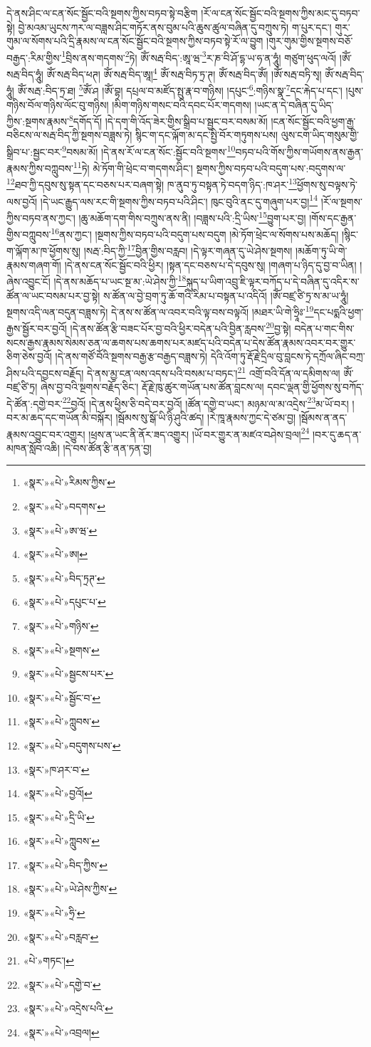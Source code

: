 དེ་ནས་ཤིང་ལ་ངན་སོང་སྦྱོང་བའི་སྔགས་ཀྱིས་བཏབ་སྟེ་བརྩིག །རོ་ལ་ངན་སོང་སྦྱོང་བའི་སྔགས་ཀྱིས་མང་དུ་བཏབ་སྟེ། བྱེ་མའམ་ཡུངས་ཀར་ལ་བཟླས་ཤིང་གཏོར་ནས་བུམ་པའི་ཆུས་ཚུལ་བཞིན་དུ་བཀྲུས་ཏེ། ག་པུར་དང་། གུར་གུམ་ལ་སོགས་པའི་དྲི་རྣམས་ལ་ངན་སོང་སྦྱོང་བའི་སྔགས་ཀྱིས་བཏབ་སྟེ་རོ་ལ་བྱུག །གུར་གུམ་གྱིས་སྔགས་བཅོ་བརྒྱད་:རིམ་གྱིས་\footnote{«སྣར་»«པེ་»རིམས་ཀྱིས་}བྲིས་ནས་གདགས་\footnote{«སྣར་»«པེ་»བདགས་}ཏེ། ཨོཾ་སརྦ་བིད་:ཨཱ་ཝ་\footnote{«སྣར་»«པེ་»ཨ་ཝ་}ར་ཎ་བི་ཤོ་དྷ་ཡ་ཧ་ན་ཧཱུཾ། གཙུག་ཕུད་ལའོ། །ཨོཾ་སརྦ་བིད་ཧཱུཾ། ཨོཾ་སརྦ་བིད་ཕཊ། ཨོཾ་སརྦ་བིད་ཨཱ།\footnote{«སྣར་»«པེ་»ཨ།} ཨོཾ་སརྦ་བིཏ་ཏྲ་ཊ། ཨོཾ་སརྦ་བིད་ཨོཾ། །ཨོཾ་སརྦ་བཏི་སྭ། ཨོཾ་སརྦ་བིད་ཧཱུཾ། ཨོཾ་སརྦ་:བིད་ཏྲ་ཐ། \footnote{«སྣར་»«པེ་»བིད་ཏྲཊ་}ཨོཾ་ཤ །ཨོཾ་བྷ། དཔྲལ་བ་མཛོད་སྤུ་རྣ་བ་གཉིས། །དཔུང་\footnote{«སྣར་»«པེ་»དཔུང་པ་}:གཉིས་སྣ་\footnote{«སྣར་»«པེ་»གཉིས་}དང་རྐེད་པ་དང་། །པུས་གཉིས་བོལ་གཉིས་ལོང་བུ་གཉིས། །མིག་གཉིས་གསང་བའི་དབང་པོར་གདགས། །ཡང་ན་དེ་བཞིན་དུ་ཡིད་ཀྱིས་:སྔགས་རྣམས་\footnote{«སྣར་»«པེ་»སྔགས་}དགོད་དོ། །དེ་དག་གི་འོད་ཟེར་གྱིས་སྒྲིབ་པ་སྦྱང་བར་བསམ་མོ། །ངན་སོང་སྦྱོང་བའི་ཕྱག་རྒྱ་བཅིངས་ལ་སརྦ་བིད་ཀྱི་སྔགས་བཟླས་ཏེ། སྙིང་ག་དང་ལྐོག་མ་དང་སྤྱི་བོར་གཏུགས་པས། ལུས་ངག་ཡིད་གསུམ་གྱི་སྒྲིབ་པ་:སྦྱང་བར་\footnote{«སྣར་»«པེ་»སྦྱངས་པར་}བསམ་མོ། །དེ་ནས་རོ་ལ་ངན་སོང་:སྦྱོང་བའི་སྔགས་\footnote{«སྣར་»«པེ་»སྦྱོང་བ་}བཏབ་པའི་གོས་ཀྱིས་གཡོགས་ནས་རྒྱན་རྣམས་ཀྱིས་བཀླུབས་\footnote{«སྣར་»«པེ་»ཀླུབས་}ཏེ། མེ་ཏོག་གི་ཕྲེང་བ་གདགས་ཤིང་། སྔགས་ཀྱིས་བཏབ་པའི་བདུག་པས་:བདུགས་ལ་\footnote{«སྣར་»«པེ་»བདུགས་པས་}ཐབ་ཀྱི་དབུས་སུ་སྟན་དང་བཅས་པར་བཞག་སྟེ། ཁ་ནུབ་ཏུ་བསྟན་ཏེ་བདག་ཉིད་:ཁ་ཤར་\footnote{«སྣར་»ཁ་ཤར་བ་}ཕྱོགས་སུ་བལྟས་ཏེ་ལས་བྱའོ། །དེ་ཡང་རྒྱུད་ལས་རང་གི་སྔགས་ཀྱིས་བཏབ་པའི་ཤིང་། ཁུང་བུའི་ནང་དུ་གཞུག་པར་བྱ།\footnote{«སྣར་»«པེ་»བྱའོ།} །རོ་ལ་སྔགས་ཀྱིས་བཏབ་ནས་ཀྱང་། །ཆུ་མཆོག་དག་གིས་བཀྲུས་ནས་ནི། །བཟླས་པའི་:དྲི་ཡིས་\footnote{«སྣར་»«པེ་»དྲི་ཡི་}བྱུག་པར་བྱ། །གོས་དང་རྒྱན་གྱིས་བཀླུབས་\footnote{«སྣར་»«པེ་»ཀླུབས་}ནས་ཀྱང་། །སྔགས་ཀྱིས་བཏབ་པའི་བདུག་པས་བདུག །མེ་ཏོག་ཕྲེང་ལ་སོགས་པས་མཆོད། །སྙིང་ག་ལྐོག་མ་ཁ་ཕྱོགས་སུ། །སརྦ་:བིད་ཀྱི་\footnote{«སྣར་»«པེ་»བིད་ཀྱིས་}བྱིན་གྱིས་བརླབ། །དེ་ལྟར་གཞན་དུ་ཡེ་ཤེས་སྔགས། །མཆོག་ཏུ་ཡི་གེ་རྣམས་གཞག་གོ། །དེ་ནས་ངན་སོང་སྦྱོང་བའི་ཕྱིར། །སྟན་དང་བཅས་པ་དེ་དབུས་སུ། །གཞག་པ་ཉིད་དུ་བྱ་བ་ཡིན། །ཞེས་འབྱུང་ངོ། །དེ་ནས་མཆོད་པ་ཡང་སྔ་མ་:ཡེ་ཤེས་ཀྱི་\footnote{«སྣར་»«པེ་»ཡེ་ཤེས་ཀྱིས་}སྐུད་པ་ཡིག་འབྲུ་ཇི་ལྟར་བཀོད་པ་དེ་བཞིན་དུ་འདིར་ས་ཚོན་ལ་ཡང་བསམ་པར་བྱ་སྟེ། ས་ཚོན་ལ་བྱེ་བྲག་ཏུ་ཆོ་གའི་རིམ་པ་བསྟན་པ་འདིའོ། །ཨོཾ་བཛྲ་ཙི་ཏྲ་ས་མ་ཡ་ཧཱུཾ། སྔགས་འདི་ལན་བདུན་བཟླས་ཏེ། དེ་ནས་ས་ཚོན་ལ་འབར་བའི་ལྟ་བས་བལྟའོ། །མཐར་ཡི་གེ་ཧྲཱིཿ་\footnote{«སྣར་»«པེ་»ཧྲི་}དང་པདྨའི་ཕྱག་རྒྱས་སྦྱོར་བར་བྱའོ། །དེ་ནས་ཚོན་རྩི་བཟང་པོར་བྱ་བའི་ཕྱིར་བདེན་པའི་བྱིན་རླབས་\footnote{«སྣར་»«པེ་»བརླབ་}བྱ་སྟེ། བདེན་པ་གང་གིས་སངས་རྒྱས་རྣམས་སེམས་ཅན་ལ་ཆགས་པས་ཆགས་པར་མཛད་པའི་བདེན་པ་དེས་ཚོན་རྣམས་འབར་བར་གྱུར་ཅིག་ཅེས་བྱའོ། །དེ་ནས་གཙོ་བོའི་སྔགས་བརྒྱ་རྩ་བརྒྱད་བཟླས་ཏེ། དེའི་འོག་ཏུ་རྡོ་རྗེ་དྲིལ་བུ་བླངས་ཏེ་དཀྲོལ་ཞིང་བཀྲ་ཤིས་པའི་དབྱངས་བརྗོད། དེ་ནས་མྱ་ངན་ལས་འདས་པའི་བསམ་པ་བཏང་།\footnote{«པེ་»གཏང་།} འགྲོ་བའི་དོན་ལ་དམིགས་ལ། ཨོཾ་བཛྲ་ཙི་ཏྲ། ཞེས་བྱ་བའི་སྔགས་བརྗོད་ཅིང་། རྡོ་རྗེ་ཁུ་ཚུར་གཡོན་པས་ཚོན་བླངས་ལ། དབང་ལྡན་གྱི་ཕྱོགས་སུ་བཀོད་དེ་ཚོན་:དགྱེ་བར་\footnote{«སྣར་»«པེ་»དགྱེ་བ་}བྱའོ། །དེ་ནས་ཕྱིས་ཅི་བདེ་བར་བྱའོ། །ཚོན་དགྱེ་བ་ཡང་། མཉམ་ལ་མ་འདྲེས་\footnote{«སྣར་»«པེ་»འདྲེས་པའི་}མ་ཡོ་བར། །བར་མ་ཆད་དང་གཡོན་མི་བསྐོར། །སྦོམས་སུ་སྒོ་ཡི་ཉི་ཤུའི་ཚད། །རེ་ཁཱ་རྣམས་ཀྱང་དེ་ཙམ་བྱ། །སྦོམས་ན་ནད་རྣམས་འབྱུང་བར་འགྱུར། །ཕྲས་ན་ཡང་ནི་ནོར་ཟད་འགྱུར། །ཡོ་བར་གྱུར་ན་མཛའ་བཤེས་བྲལ།\footnote{«སྣར་»«པེ་»འབྲལ།} །བར་དུ་ཆད་ན་མཁན་སློབ་འཆི། །དེ་བས་ཚོན་རྩི་ནན་ཏན་བྱ། 
